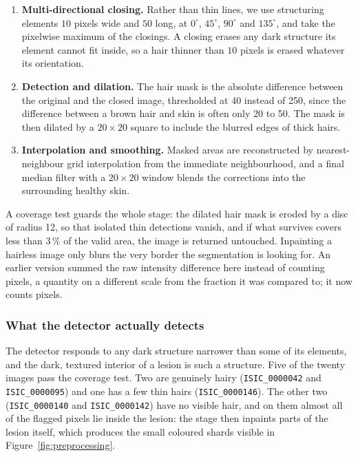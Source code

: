 \documentclass[11pt,a4paper]{article}
\begin{document}
\begin{enumerate}
  \item \textbf{Multi-directional closing.} Rather than thin lines, we use
  structuring elements $10$ pixels wide and $50$ long, at $0^\circ$, $45^\circ$,
  $90^\circ$ and $135^\circ$, and take the pixelwise maximum of the closings. A
  closing erases any dark structure its element cannot fit inside, so a hair
  thinner than $10$ pixels is erased whatever its orientation.
  \item \textbf{Detection and dilation.} The hair mask is the absolute
  difference between the original and the closed image, thresholded at 40
  instead of 250, since the difference between a brown hair and skin is often
  only 20 to 50. The mask is then dilated by a $20 \times 20$ square to include
  the blurred edges of thick hairs.
  \item \textbf{Interpolation and smoothing.} Masked areas are reconstructed by
  nearest-neighbour grid interpolation from the immediate neighbourhood, and a
  final median filter with a $20 \times 20$ window blends the corrections into
  the surrounding healthy skin.
\end{enumerate}

A coverage test guards the whole stage: the dilated hair mask is eroded by a
disc of radius 12, so that isolated thin detections vanish, and if what
survives covers less than $3\,\%$ of the valid area, the image is returned
untouched. Inpainting a hairless image only blurs the very border the
segmentation is looking for. An earlier version summed the raw intensity
difference here instead of counting pixels, a quantity on a different scale
from the fraction it was compared to; it now counts pixels.

\subsubsection{What the detector actually detects}
\label{sec:hair-limits}

The detector responds to any dark structure narrower than some of its
elements, and the dark, textured interior of a lesion is such a structure.
Five of the twenty images pass the coverage test. Two are genuinely hairy
(\texttt{ISIC\_0000042} and \texttt{ISIC\_0000095}) and one has a few thin
hairs (\texttt{ISIC\_0000146}). The other two (\texttt{ISIC\_0000140} and
\texttt{ISIC\_0000142}) have no visible hair, and on them almost all of the
flagged pixels lie inside the lesion: the stage then inpaints parts of the
lesion itself, which produces the small coloured shards visible in
Figure~\ref{fig:preprocessing}.
\end{document}
